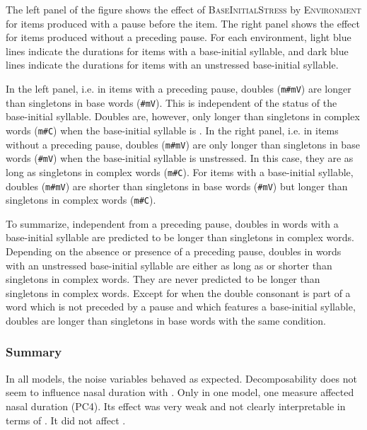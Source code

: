 The left panel of the figure shows the effect of \textsc{BaseInitialStress} by \textsc{Environment} for items produced with a pause before the item. The right panel shows the effect for items produced without a preceding pause. For each environment, light blue lines indicate the durations for items with a  base-initial syllable, and dark blue lines indicate the durations for items with an unstressed base-initial syllable.


In the left panel, i.e. in items with a preceding pause, doubles (\texttt{m\#mV}) are longer than singletons in base words (\texttt{\#mV}). This is independent of the  status of the base-initial syllable. Doubles are, however, only longer than singletons in complex words (\texttt{m\#C}) when the base-initial syllable is .
In the right panel, i.e. in items without a preceding pause, doubles (\texttt{m\#mV}) are only longer than singletons in base words (\texttt{\#mV}) when the base-initial syllable is unstressed. In this case, they are as long as singletons in complex words (\texttt{m\#C}). For items with a  base-initial syllable, doubles (\texttt{m\#mV}) are shorter than singletons in base words (\texttt{\#mV}) but longer than singletons in complex words (\texttt{m\#C}).

To summarize, independent from a preceding pause, doubles in words with a  base-initial syllable are predicted to be longer than singletons in complex words. Depending on the absence or presence of a preceding pause, doubles in words with an unstressed base-initial syllable are either as long as or shorter than singletons in complex words. They are never predicted to be longer than singletons in complex words. 
Except for when the double consonant is part of a word which is not preceded by a pause and which features a  base-initial syllable, doubles are longer than singletons in base words with the same condition.


\subsubsection{Summary}


In all models, the noise variables behaved as expected. Decomposability does not seem to influence nasal duration with . Only in one model, one  measure affected nasal duration (\textsc{PC4}). Its effect was very weak and not clearly interpretable in terms of . It did not affect .


